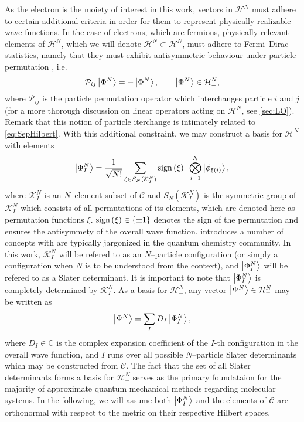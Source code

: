 As the electron is the moiety of interest in this work, vectors in $\mathcal{H}^N$ must adhere to certain additional 
criteria in order for them to represent physically realizable wave functions. In the case of electrons, which are 
fermions, physically relevant elements of $\mathcal{H}^N$, which we will denote $\mathcal{H}^N_- \subset \mathcal{H}^N$, must 
adhere to Fermi--Dirac statistics, namely that they must exhibit antisymmetric behaviour under particle permutation
\cite{Walecka12_book,Schuck04_book}, i.e.
\begin{equation}
  \label{eq:FermiDirac}
  \mathcal{P}_{ij} \left\vert \Phi^N \right\rangle = -\left\vert \Phi^N \right\rangle, \qquad \left\vert \Phi^N \right\rangle \in \mathcal{H}^N_-,
\end{equation} 
where $\mathcal{P}_{ij}$ is the particle permutation operator which interchanges particle $i$ and $j$ 
(for a more thorough discussion on linear operators acting on $\mathcal{H}^N$, see \cref{sec:LO}). Remark
that this notion of particle iterchange is intimately related to \cref{eq:SepHilbert}. With this additional
constraint, we may construct a basis for $\mathcal{H}^N_-$ with elements
\begin{equation}
  \label{eq:SlaterDet}
  \left\vert \Phi^N_I \right\rangle = \frac{1}{\sqrt{N!}} \sum_{\xi \in S_N(\mathcal{K}^N_I)} \mathrm{sign}\left( \xi \right) \text{ } \bigotimes_{i = 1 }^N \left\vert \phi_{\xi(i)} \right\rangle,
\end{equation}
where $\mathcal{K}_I^N$ is an $N$--element subset of $\mathcal{C}$ and $S_N(\mathcal{K}_I^N)$ is the symmetric group
of $\mathcal{K}_I^N$ which consists of all permutations of its elements, which are denoted here as permutation
functions $\xi$. $\mathrm{sign}\left( \xi \right) \in \{ \pm 1 \}$ denotes the sign of the permutation and ensures the antisymmety of
the overall wave function.  introduces a number of concepts with are typically jargonized 
in the quantum chemistry community. In this work, $\mathcal{K}_I^N$ will be refered to as an $N$--particle
configuration (or simply a configuration when $N$ is to be understood from the context), and $\left\vert \Phi^N_I \right\rangle$
will be refered to as a Slater determinant. It is important to note that $\left\vert \Phi^N_I \right\rangle$ is completely 
determined by $\mathcal{K}_I^N$. As a basis for $\mathcal{H}^N_-$, any vector $\left\vert \Psi^N \right\rangle \in \mathcal{H}^N_-$
may be written as \cite{Ostlund12_book}
\begin{equation}
\left\vert \Psi^N \right\rangle = \sum_I D_I \left\vert \Phi^N_I \right\rangle,
\end{equation}
where $D_I\in\mathbb C$ is the complex expansion coefficient of the $I$-th configuration in the overall wave function,
and $I$ runs over all possible $N$--particle Slater determinants which may be constructed from $\mathcal{C}$.
The fact that the set of all Slater determinants forms a basis for $\mathcal{H}^N_-$
serves as the primary foundataion for the majority of approximate quantum mechanical methods regarding molecular
systems. In the following, we will assume both $\left\vert \Phi^N_I \right\rangle$ and the elements of $\mathcal{C}$ are orthonormal
with respect to the metric on their respective Hilbert spaces.

